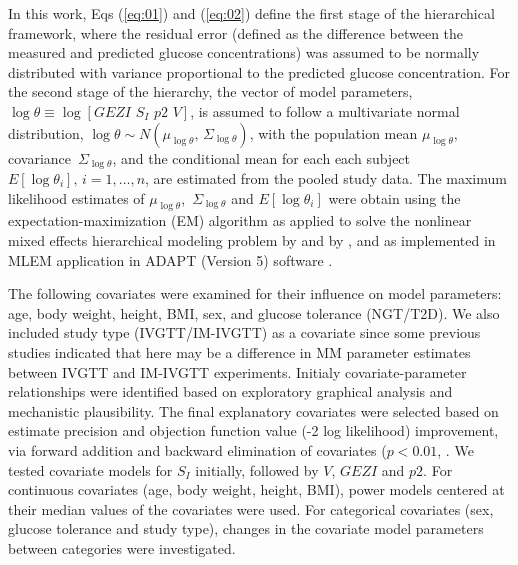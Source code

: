 \documentclass[utf8]{frontiersSCNS} %
\begin{document}
In this work, Eqs (\ref{eq:01}) and (\ref{eq:02}) define the first stage of the hierarchical framework, where the residual error (defined as the difference between the measured and predicted glucose concentrations) was assumed to be normally distributed with variance proportional to the predicted glucose concentration. For the second stage of the hierarchy, the vector of model parameters, $\log \theta  \equiv \log \left[ {GEZI\,\,{S_I}\,\,p2\,\,V} \right]$, is assumed to follow a multivariate normal distribution, $\log \theta  \sim N\left( {{\mu_{\log \theta }},\,{\Sigma _{\log \theta }}} \right)$, with the population mean   ${\mu _{\log \theta }}$, covariance $\,{\Sigma _{\log \theta }}$, and the conditional mean for each each subject $E\left[ {\log {\theta _i}} \right],\,i = 1, \ldots ,n$, are estimated from the pooled study data. The maximum likelihood estimates of   ${\mu _{\log \theta }}$, $\,{\Sigma _{\log \theta }}$ and $E\left[ {\log {\theta _i}} \right]$ were obtain using the expectation-maximization (EM) algorithm as applied to solve the nonlinear mixed effects hierarchical modeling problem by \citet{Schumitzky1995EMAnalysis} and  by \citet{walker_1996}, and as implemented in  MLEM application in ADAPT (Version 5) software \citep{AdaptUserGuide}. 

The following covariates were examined for their influence on  model parameters: age, body weight, height, BMI, sex, and glucose tolerance (NGT/T2D). We also included  study type (IVGTT/IM-IVGTT) as a covariate since some previous studies indicated that here may be a difference in MM parameter estimates between IVGTT and IM-IVGTT experiments. Initialy covariate-parameter relationships were identified based on exploratory graphical analysis and mechanistic plausibility. The final explanatory covariates were selected based on estimate precision and  objection function value (-2 log likelihood) improvement, via forward addition and backward elimination of covariates ($p<0.01$,  \citet{Bonate2011}. We tested covariate models for $S_I$ initially, followed by $V$, $GEZI$ and $p2$. For continuous covariates (age, body weight, height, BMI), power models centered at their median values of the covariates were used. For categorical covariates (sex, glucose tolerance and study type), changes in the covariate model parameters between categories were investigated. 

\vskip 0.5cm
\end{document}
